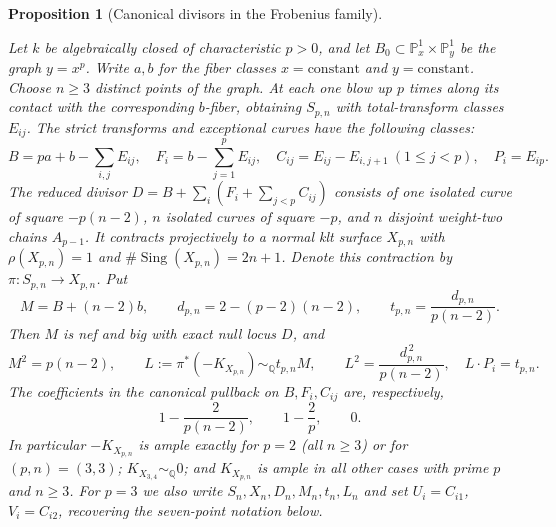 \documentclass[11pt,reqno]{amsart}
\newtheorem{proposition}[proposition]{Proposition}
\theoremstyle{definition}
\theoremstyle{remark}
\DeclareMathOperator{\Sing}{Sing}
\newcommand{\PP}{\mathbb P}
\newcommand{\QQ}{\mathbb Q}
\numberwithin{equation}{section}
\begin{document}
\begin{proposition}[Canonical divisors in the Frobenius family]
\label{prop:frobenius-family}

Let $k$ be algebraically closed of characteristic $p>0$, and let
$B_0\subset\PP^1_x\times\PP^1_y$ be the graph $y=x^p$.
Write $a,b$ for the fiber classes $x=\text{constant}$ and
$y=\text{constant}$. Choose $n\ge3$ distinct points of the graph.
At each one blow up $p$ times along its contact with the corresponding
$b$-fiber, obtaining $S_{p,n}$ with total-transform classes $E_{ij}$.
The strict transforms and exceptional curves have the following classes:
\[
 B=pa+b-\sum_{i,j}E_{ij},\quad
 F_i=b-\sum_{j=1}^pE_{ij},\quad
 C_{ij}=E_{ij}-E_{i,j+1}\ (1\le j<p),\quad P_i=E_{ip}.
\]
The reduced divisor $D=B+\sum_i(F_i+\sum_{j<p}C_{ij})$ consists of
one isolated curve of square $-p(n-2)$, $n$ isolated curves of square
$-p$, and $n$ disjoint weight-two chains $A_{p-1}$.
It contracts projectively to a normal klt surface $X_{p,n}$ with
$\rho(X_{p,n})=1$ and $\#\Sing(X_{p,n})=2n+1$. Denote this
contraction by $\pi:S_{p,n}\to X_{p,n}$. Put
\[
 M=B+(n-2)b,
 \qquad d_{p,n}=2-(p-2)(n-2),
 \qquad t_{p,n}=\frac{d_{p,n}}{p(n-2)}.
\]
Then $M$ is nef and big with exact null locus $D$, and
\[
 M^2=p(n-2),\qquad
 L:=\pi^*(-K_{X_{p,n}})\sim_{\QQ}t_{p,n}M,
 \qquad L^2=\frac{d_{p,n}^{\,2}}{p(n-2)},\quad L\cdot P_i=t_{p,n}.
\]
The coefficients in the canonical pullback on $B,F_i,C_{ij}$ are, respectively,
\[
 1-\frac{2}{p(n-2)},\qquad 1-\frac2p,\qquad 0.
\]
In particular $-K_{X_{p,n}}$ is ample exactly for $p=2$ (all $n\ge3$)
or for $(p,n)=(3,3)$; $K_{X_{3,4}}\sim_{\QQ}0$; and $K_{X_{p,n}}$
is ample in all other cases with prime $p$ and $n\ge3$.
For $p=3$ we also write $S_n,X_n,D_n,M_n,t_n,L_n$ and set
$U_i=C_{i1}$, $V_i=C_{i2}$, recovering the seven-point notation below.
\end{proposition}
\end{document}
